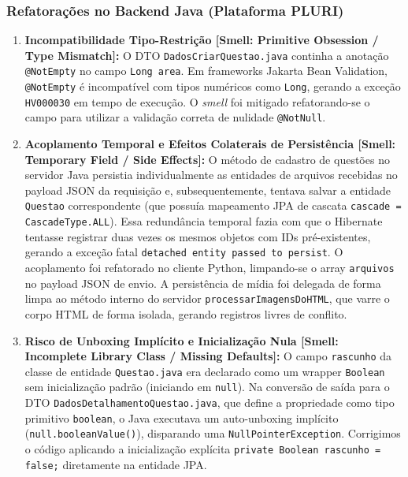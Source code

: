 \documentclass[sigconf]{acmart}
\begin{document}
\subsubsection{Refatorações no Backend Java (Plataforma PLURI)}
\begin{enumerate}
\item \textbf{Incompatibilidade Tipo-Restrição [Smell: Primitive Obsession / Type Mismatch]:} O DTO \lstinline{DadosCriarQuestao.java} continha a anotação \lstinline{@NotEmpty} no campo \lstinline{Long area}. Em frameworks Jakarta Bean Validation, \lstinline{@NotEmpty} é incompatível com tipos numéricos como \lstinline{Long}, gerando a exceção \lstinline{HV000030} em tempo de execução. O \textit{smell} foi mitigado refatorando-se o campo para utilizar a validação correta de nulidade \lstinline{@NotNull}.
\item \textbf{Acoplamento Temporal e Efeitos Colaterais de Persistência [Smell: Temporary Field / Side Effects]:} O método de cadastro de questões no servidor Java persistia individualmente as entidades de arquivos recebidas no payload JSON da requisição e, subsequentemente, tentava salvar a entidade \lstinline{Questao} correspondente (que possuía mapeamento JPA de cascata \lstinline{cascade = CascadeType.ALL}). Essa redundância temporal fazia com que o Hibernate tentasse registrar duas vezes os mesmos objetos com IDs pré-existentes, gerando a exceção fatal \lstinline{detached entity passed to persist}. O acoplamento foi refatorado no cliente Python, limpando-se o array \lstinline{arquivos} no payload JSON de envio. A persistência de mídia foi delegada de forma limpa ao método interno do servidor \lstinline{processarImagensDoHTML}, que varre o corpo HTML de forma isolada, gerando registros livres de conflito.
\item \textbf{Risco de Unboxing Implícito e Inicialização Nula [Smell: Incomplete Library Class / Missing Defaults]:} O campo \lstinline{rascunho} da classe de entidade \lstinline{Questao.java} era declarado como um wrapper \lstinline{Boolean} sem inicialização padrão (iniciando em \lstinline{null}). Na conversão de saída para o DTO \lstinline{DadosDetalhamentoQuestao.java}, que define a propriedade como tipo primitivo \lstinline{boolean}, o Java executava um auto-unboxing implícito (\lstinline{null.booleanValue()}), disparando uma \lstinline{NullPointerException}. Corrigimos o código aplicando a inicialização explícita \lstinline{private Boolean rascunho = false;} diretamente na entidade JPA.
\end{enumerate}
\end{document}
